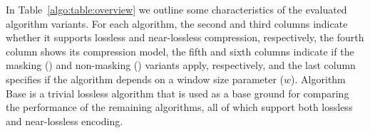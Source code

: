 \spaceForThisSection
In Table~\ref{algo:table:overview} we outline some characteristics of the evaluated algorithm variants. For each algorithm, the second and third columns indicate whether it supports lossless and near-lossless compression, respectively, the fourth column shows its compression model, the fifth and sixth columns indicate if the masking (\maskalgo) and non-masking (\NOmaskalgo) variants apply, respectively, and the last column specifies if the algorithm depends on a window size parameter ($w$). Algorithm Base is a trivial lossless algorithm that is used as a base ground for comparing the performance of the remaining algorithms, all of which support both lossless and near-lossless encoding.




